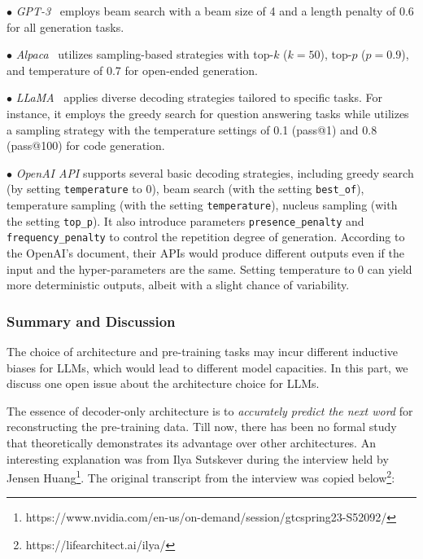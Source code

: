 {$\bullet$ \emph{GPT-3}~\cite{Brown-NeurIPS-2020-Language} employs beam search with a beam size of 4 and a length penalty of 0.6 for all generation tasks.

$\bullet$ \emph{Alpaca}~\cite{Taori-github-2023-Stanford} utilizes sampling-based strategies %
{with top-$k$ ($k=50$), top-$p$  ($p=0.9$)}, and temperature of 0.7 for open-ended generation.

$\bullet$ \emph{LLaMA}~\cite{Touvron-arxiv-2023-LLaMA} applies diverse decoding strategies tailored to specific tasks. For instance, it employs the greedy search for question answering tasks while utilizes a sampling strategy with the temperature settings of 0.1 (pass@1) and 0.8 (pass@100) for code generation.


$\bullet$ \emph{OpenAI API}  %
{supports several basic decoding strategies, including greedy search (by setting \texttt{temperature} to 0), beam search (with the setting \texttt{best\_of}), temperature sampling (with the setting \texttt{temperature}), nucleus sampling (with the setting \texttt{top\_p}). It also introduce parameters \texttt{presence\_penalty} and \texttt{frequency\_penalty} to control the repetition degree of generation.} 
{According to the OpenAI's document, their APIs would produce different outputs even if the input and the hyper-parameters are the same. Setting temperature to 0 can yield more deterministic outputs, albeit with a slight chance of variability.}


\subsubsection{Summary and Discussion}\label{sec-summary-arc}

The choice of architecture and pre-training tasks may incur different inductive biases for LLMs, which would lead to different model capacities. %
In this part, we discuss one open issue about the  architecture choice for LLMs.


\begin{center}
\begin{tcolorbox}[colback=blue!5!white,colframe=blue!55!black,width=0.48\textwidth,title={Why does Predicting the Next Word Works?}]
{
The essence of decoder-only architecture is to \emph{accurately predict the next word} for reconstructing the pre-training data. Till now, there has been no formal study that theoretically  demonstrates its advantage over other architectures. An interesting explanation was from  Ilya Sutskever during the interview held by Jensen Huang\footnote{https://www.nvidia.com/en-us/on-demand/session/gtcspring23-S52092/}. 
The original transcript from the interview was copied below\footnote{https://lifearchitect.ai/ilya/}:  
\\

}
\end{tcolorbox}
\end{center}}
